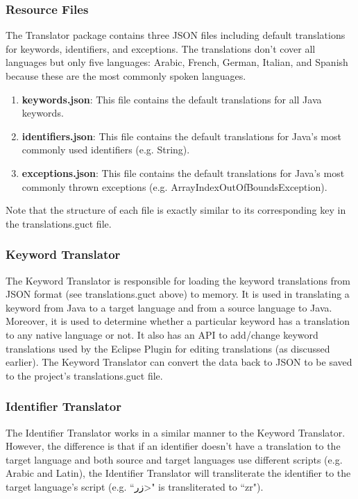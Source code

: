 \subsubsection{Resource Files}
The Translator package contains three JSON files including default translations for keywords, identifiers, and exceptions. The translations don't cover all languages but only five languages: Arabic, French, German, Italian, and Spanish because these are the most commonly spoken languages.
\begin{enumerate}
    \item \textbf{keywords.json}: This file contains the default translations for all Java keywords.
    \item \textbf{identifiers.json}: This file contains the default translations for Java's most commonly used identifiers (e.g. String).
    \item \textbf{exceptions.json}: This file contains the default translations for Java's most commonly thrown exceptions (e.g. ArrayIndexOutOfBoundsException).
\end{enumerate}
Note that the structure of each file is exactly similar to its corresponding key in the translations.guct file.

\subsubsection{Keyword Translator}
The Keyword Translator is responsible for loading the keyword translations from JSON format (see translations.guct above) to memory. It is used in translating a keyword from Java to a target language and from a source language to Java. Moreover, it is used to determine whether a particular keyword has a translation to any native language or not. It also has an API to add/change keyword translations used by the Eclipse Plugin for editing translations (as discussed earlier). The Keyword Translator can convert the data back to JSON to be saved to the project's translations.guct file.
\subsubsection{Identifier Translator}
The Identifier Translator works in a similar manner to the Keyword Translator. However, the difference is that if an identifier doesn't have a translation to the target language and both source and target languages use different scripts (e.g. Arabic and Latin), the Identifier Translator will transliterate the identifier to the target language's script (e.g. ``\<زر>" is transliterated to ``zr").
